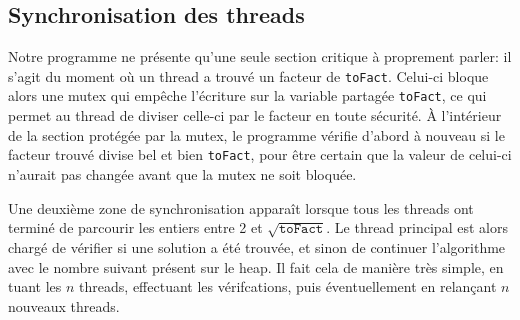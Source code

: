 \documentclass[a4paper,10pt]{article}
\begin{document}


\subsection*{Synchronisation des threads}

Notre programme ne présente qu'une seule section critique à proprement parler: il s'agit du moment où un thread a trouvé un facteur de \texttt{toFact}. Celui-ci bloque alors une mutex qui empêche l'écriture sur la variable partagée \texttt{toFact}, ce qui permet au thread de diviser celle-ci par le facteur en toute sécurité. À l'intérieur de la section protégée par la mutex, le programme vérifie d'abord à nouveau si le facteur trouvé divise bel et bien \texttt{toFact}, pour être certain que la valeur de celui-ci n'aurait pas changée avant que la mutex ne soit bloquée.

Une deuxième zone de synchronisation apparaît lorsque tous les threads ont terminé de parcourir les entiers entre 2 et $\sqrt{\texttt{toFact}}$. Le thread principal est alors chargé de vérifier si une solution a été trouvée, et sinon de continuer l'algorithme avec le nombre suivant présent sur le heap. Il fait cela de manière très simple, en tuant les $n$ threads, effectuant les vérifcations, puis éventuellement en relançant $n$ nouveaux threads.
\end{document}
